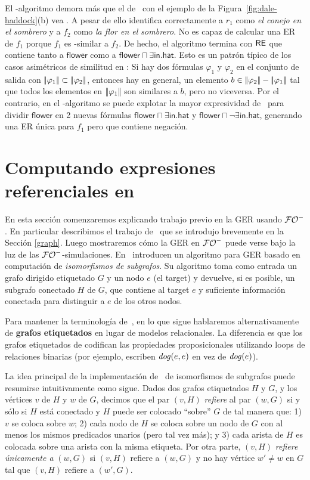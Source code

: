 El \el-algoritmo demora m\'as que el de \alc\ con el ejemplo de la Figura~\ref{fig:dale-haddock}(b) vea \cite{Stone1998a}. A pesar de ello
identifica correctamente a $r_1$ como \textit{el conejo en el sombrero} y a $ f_2$ como
\textit{la flor en el sombrero}. No es capaz de calcular una ER de $f_1$
porque $f_1$ es \el-similar a $f_2$. De hecho, el algoritmo
termina con $ \textsf{RE} $ que contiene tanto a $\mathsf{flower}$ como a
$\mathsf{flower} \sqcap \exists \mathsf{in}.\mathsf{hat}$. Esto es un
patr\'on t\'ipico de los casos asim\'etricos de similitud en \EL: Si hay
dos f\'ormulas $ \varphi_1 $ y $ \varphi_2$ en el conjunto de salida con
$|\!|\varphi_1|\!| \subset |\!|\varphi_2|\!|$, entonces hay
en general, un elemento $b \in |\!|\varphi_2|\!| -
|\!|\varphi_1|\!|$ tal que todos los elementos en $|\!|\varphi_1|\!| $ 
son similares a $ b $, pero no viceversa. Por el contrario, en el \alc-algoritmo se puede explotar la mayor expresividad de \alc\ para dividir
$\mathsf{flower}$ en 2 nuevas f\'ormulas $\mathsf{flower} \sqcap
\exists \mathsf{in}.\mathsf{hat}$ y $\mathsf{flower} \sqcap \neg
\exists \mathsf{in}.\mathsf{hat}$, generando una ER \'unica para $f_1  $ pero que contiene negaci\'on.

\section{Computando expresiones referenciales en \EPFOL}
\label{sec:computandoEnFOL}
En esta secci\'on comenzaremos explicando trabajo previo en la GER usando ${\mathcal{FO}^-}$. En particular describimos el trabajo de~\cite{graph} que se introdujo brevemente en la Secci\'on \ref{graph}. Luego mostraremos c\'omo la GER en ${\mathcal{FO}^-}$ puede verse bajo la luz de las ${\mathcal{FO}^-}$-simulaciones.
En~\cite{graph} introducen un algoritmo para GER basado en computaci\'on de \emph{isomorfismos de subgrafos}. Su algoritmo toma como entrada
un grafo dirigido etiquetado $G$ y un nodo $e$ (el target) y devuelve, si es posible,
un subgrafo conectado $H$ de $G$, que contiene al target $e$ y suficiente informaci\'on conectada para
distinguir a $e$ de los otros nodos.

Para mantener la terminolog\'ia de~\cite{graph}, en lo que sigue
hablaremos alternativamente de \textbf{grafos etiquetados} en lugar de modelos relacionales. La diferencia es que los grafos etiquetados de \cite{graph} codifican las propiedades proposicionales utilizando
loops de relaciones binarias (por ejemplo, escriben $\mathit{dog}(e,e)$ en vez de $\mathit{dog}(e)$).

La idea principal de la implementaci\'on de~\cite{graph} de isomorfismos de subgrafos puede resumirse intuitivamente como sigue.
Dados dos grafos etiquetados $H$ y $G$, y los v\'ertices  $v$ de $H$
y $w$ de $G$, decimos que el par $(v, H)$ {\em refiere}
al par $(w, G)$ si y s\'olo si $H$ est\'a conectado y $H$ puede ser colocado ``sobre'' $G$ de tal manera que: 1) $v$ se coloca sobre $w$; 2) cada
nodo de $H$ se coloca sobre un nodo de $G$ con al menos los mismos
predicados unarios (pero tal vez m\'as); y 3) cada arista de $H$ es
colocada sobre una arista con la misma etiqueta. Por otra parte, $(v, H)$ {\em
refiere \'unicamente a} $(w, G)$ si $(v, H)$ refiere a $(w, G)$ y no hay
v\'ertice $w'\not=w$ en $G$ tal que $(v, H)$ refiere a $(w', G)$.

